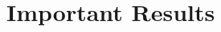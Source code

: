\documentclass[handout]{beamer}%
\newcommand{\F}{\mathbb F}
\theoremstyle{definition}
\begin{document}
% 
% 
% 
% 
% 
% 




%
%
%

\section{Important Results}
\end{document}
